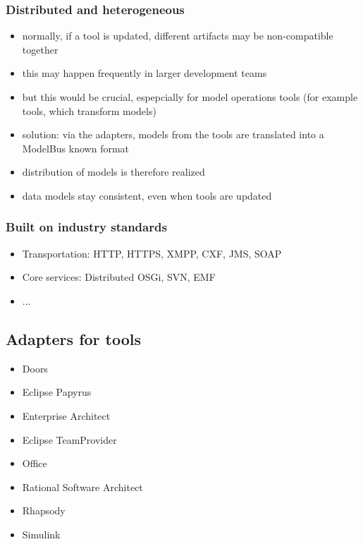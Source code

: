 \subsubsection{Distributed and heterogeneous}

\begin{itemize}
\item normally, if a tool is updated, different artifacts may be non-compatible together
\item this may happen frequently in larger development teams
\item but this would be crucial, espepcially for model operations tools (for example tools, which transform models)
\item solution: via the adapters, models from the tools are translated into a ModelBus known format
\item distribution of models is therefore realized
\item data models stay consistent, even when tools are updated
\end{itemize}

\subsubsection{Built on industry standards}

\begin{itemize}
\item Transportation: HTTP, HTTPS, XMPP, CXF, JMS, SOAP
\item Core services: Distributed OSGi, SVN, EMF
\item  ...
\end{itemize}

\subsection{Adapters for tools}

\begin{itemize}
\item Doors
\item Eclipse Papyrus
\item Enterprise Architect
\item Eclipse TeamProvider
\item Office
\item Rational Software Architect
\item Rhapsody
\item Simulink
\end{itemize}

